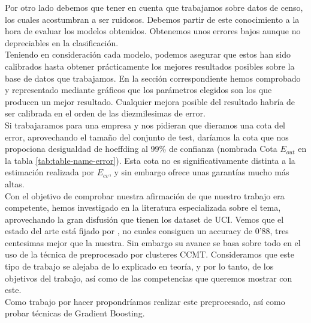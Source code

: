 \documentclass[11pt,a4paper]{article}
\begin{document}
Por otro lado debemos que tener en cuenta que trabajamos sobre datos de censo, los cuales acostumbran a ser ruidosos. Debemos partir de este conocimiento a la hora de evaluar los modelos obtenidos. Obtenemos unos errores bajos aunque no depreciables en la clasificación.\\

Teniendo en consideración cada modelo, podemos asegurar que estos han sido calibrados hasta obtener prácticamente los mejores resultados posibles sobre la base de datos que trabajamos. En la sección correspondiente hemos comprobado y representado mediante gráficos que los parámetros elegidos son los que producen un mejor resultado. Cualquier mejora posible del resultado habría de ser calibrada en el orden de las diezmilesimas de error.\\

Si trabajaramos para una empresa y nos pidieran que dieramos una cota del error, aprovechando el tamaño del conjunto de test, daríamos la cota que nos propociona desigualdad de hoeffding al 99\% de confianza (nombrada Cota $E_{out}$ en la tabla \ref{tab:table-name-error}). Esta cota no es significativamente distinta a la estimación realizada por $E_{cv}$, y sin embargo ofrece unas garantías mucho más altas. \\

 Con el objetivo de comprobar nuestra afirmación de que nuestro trabajo era competente, hemos investigado en la literatura especializada sobre el tema, aprovechando la gran disfusión que tienen los dataset de UCI. Vemos que el estado del arte está fijado por \cite{statistical}, no cuales consiguen un accuracy de 0'88, tres centesimas mejor que la nuestra. Sin embargo su avance se basa sobre todo en el uso de la técnica de preprocesado por clusteres CCMT. Consideramos que este tipo de trabajo se alejaba de lo explicado en teoría, y por lo tanto, de los objetivos del trabajo, así como de las competencias que queremos mostrar con este.\\
 
 
 Como trabajo por hacer propondríamos realizar este preprocesado, así como probar técnicas de Gradient Boosting.\\
 
 
\end{document}
